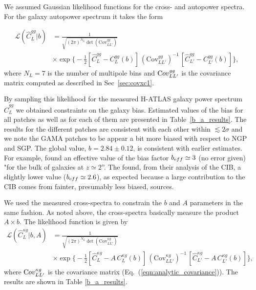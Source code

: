 We assumed Gaussian likelihood functions for the cross- and autopower spectra. For the galaxy autopower spectrum it takes the form

\begin{equation}
\label{eqn:like_gg}
\begin{split}
\mathcal{L}(\hat{C}^{gg}_{L}|b) &= \frac{1}{\sqrt{(2\pi)^{N_{L}}\det(\text{Cov}^{gg}_{LL'})}} \\
&\times \exp \Biggl\{ -\frac{1}{2} [\hat{C}^{gg}_{L} - C^{gg}_{L}(b)] \,(\text{Cov}^{gg}_{LL'})^{-1} \, [\hat{C}^{gg}_{L'} - C^{gg}_{L'}(b)]  \Biggr\},
\end{split}
\end{equation}
where $N_{L} = 7$ is the number of multipole bins and $\rm Cov^{gg}_{LL'}$ is the covariance matrix computed as described in Sec~\eqref{sec:covxc1}.

By sampling this likelihood for the measured H-ATLAS galaxy power spectrum $\hat{C}^{gg}_{L}$ we obtained constraints on the galaxy bias. Estimated values of the bias for all patches as well as for each of them  are presented in Table~\eqref{b_a_results}. The results for the different patches are consistent with each other within $\lesssim 2\sigma$ and we note the GAMA patches to be appear a bit more biased with respect to NGP and SGP. The global value, $b=2.84\pm 0.12$, is consistent with earlier estimates. For example, \cite{Xia2012} found an effective value of the bias factor $b_{\rm eff}\simeq 3$ (no error given) "for the bulk of galaxies at $z\simeq 2$''. The \cite{Ade2014h} found, from their analysis of the CIB, a slightly lower value ($b_{\rm eff}\simeq 2.6$), as expected because a large contribution to the CIB comes from fainter, presumably less biased, sources.

We used the measured cross-spectra to constrain the $b$ and $A$ parameters in the same fashion. As noted above, the cross-spectra basically measure the product $A\times b$. The likelihood function is given by
\begin{equation}
\label{eqn:like_kg}
\begin{split}
\mathcal{L}(\hat{C}^{\kappa g}_{L}|b,A) &= \frac{1}{\sqrt{(2\pi)^{N_{L}}\det(\text{Cov}^{\kappa g}_{LL'})}}\\
&\times \exp \Biggl\{ -\frac{1}{2} [\hat{C}^{\kappa g}_{L} - A\,C^{\kappa g}_{L}(b)] \,(\text{Cov}_{LL'}^{\kappa g})^{-1} \, [\hat{C}^{\kappa g}_{L'} - A\,C^{\kappa g}_{L'}(b)]  \Biggr\},
\end{split}
\end{equation}
where $\rm Cov^{\kappa g}_{LL'}$ is the covariance matrix (Eq.~(\eqref{eqn:analytic_covariance})). The results are shown in Table \eqref{b_a_results}.

